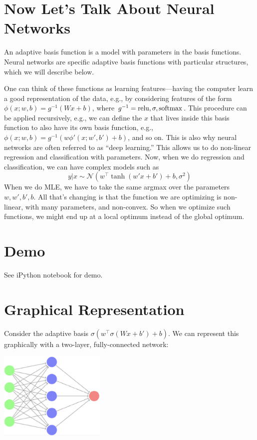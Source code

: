 \documentclass{article}
\begin{document}
\section{Now Let's Talk About Neural Networks}

An adaptive basis function is a model with parameters in the basis functions. Neural networks are specific adaptive basis functions with particular structures, which we will describe below.

One can think of these functions as learning features---having the computer learn a good representation of the data, e.g., by considering features of the form $\phi(x; w, b) = g^{-1}(Wx + b)$, where $g^{-1} = \operatorname{relu}, \sigma, \operatorname{softmax}$. This procedure can be applied recursively, e.g., we can define the $x$ that lives inside this basis function to also have its own basis function, e.g., $\phi(x; w, b) = g^{-1}(w\phi'(x; w', b') + b)$, and so on. This is also why neural networks are often referred to as ``deep learning.'' This allows us to do non-linear regression and classification with parameters. Now, when we do regression and classification, we can have complex models such as
$$y | x \sim \mathcal{N}(w^\top\tanh(w'x + b') + b, \sigma^2)$$
When we do MLE, we have to take the same argmax over the parameters $w, w', b', b$. All that's changing is that the function we are optimizing is non-linear, with many parameters, and non-convex. So when we optimize such functions, we might end up at a local optimum instead of the global optimum.

\section{Demo}

See iPython notebook for demo.

\section{Graphical Representation}

Consider the adaptive basis $\sigma(w^\top \sigma(Wx + b') + b)$. We can represent this graphically with a two-layer, fully-connected network:

\begin{center}
    \includegraphics[width=2in]{7/neural-network.png}
\end{center}
\end{document}
